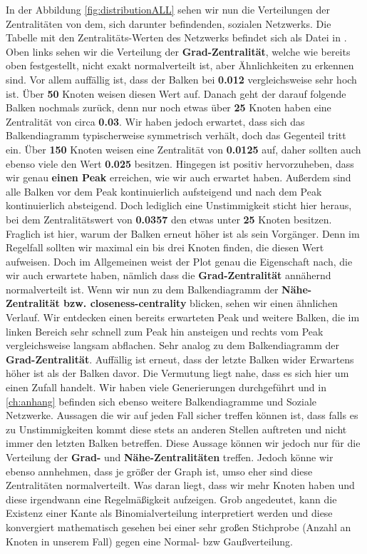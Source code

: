 In der Abbildung \ref{fig:distributionALL} sehen wir nun die Verteilungen der Zentralitäten von dem, sich darunter befindenden, sozialen Netzwerks. Die Tabelle mit den Zentralitäts-Werten des Netzwerks befindet sich als Datei in \cite{TZ}. Oben links sehen wir die Verteilung der \textbf{Grad-Zentralität}, welche wie bereits oben festgestellt, nicht exakt normalverteilt ist, aber Ähnlichkeiten zu erkennen sind. Vor allem auffällig ist, dass der Balken bei \textbf{0.012} vergleichsweise sehr hoch ist. Über \textbf{50} Knoten weisen diesen Wert auf. Danach geht der darauf folgende Balken nochmals zurück, denn nur noch etwas über \textbf{25} Knoten haben eine Zentralität von circa \textbf{0.03}. Wir haben jedoch erwartet, dass sich das Balkendiagramm typischerweise symmetrisch verhält, doch das Gegenteil tritt ein. Über \textbf{150} Knoten weisen eine Zentralität von \textbf{0.0125} auf, daher sollten auch ebenso viele den Wert \textbf{0.025} besitzen. Hingegen ist positiv hervorzuheben, dass wir genau \textbf{einen Peak} erreichen, wie wir auch erwartet haben. Außerdem sind alle Balken vor dem Peak kontinuierlich aufsteigend und nach dem Peak kontinuierlich absteigend. Doch lediglich eine Unstimmigkeit sticht hier heraus, bei dem Zentralitätswert von \textbf{0.0357} den etwas unter \textbf{25} Knoten besitzen. Fraglich ist hier, warum der Balken erneut höher ist als sein Vorgänger. Denn im Regelfall sollten wir maximal ein bis drei Knoten finden, die diesen Wert aufweisen. Doch im Allgemeinen weist der Plot genau die Eigenschaft nach, die wir auch erwartete haben, nämlich dass die \textbf{Grad-Zentralität} annähernd normalverteilt ist. Wenn wir nun zu dem Balkendiagramm der \textbf{Nähe-Zentralität bzw. closeness-centrality} blicken, sehen wir einen ähnlichen Verlauf. Wir entdecken einen bereits erwarteten Peak und weitere Balken, die im linken Bereich sehr schnell zum Peak hin ansteigen und rechts vom Peak vergleichsweise langsam abflachen. Sehr analog zu dem Balkendiagramm der \textbf{Grad-Zentralität}. Auffällig ist erneut, dass der letzte Balken wider Erwartens höher ist als der Balken davor. Die Vermutung liegt nahe, dass es sich hier um einen Zufall handelt. Wir haben viele Generierungen durchgeführt und in \ref{ch:anhang} befinden sich ebenso weitere Balkendiagramme und Soziale Netzwerke. Aussagen die wir auf jeden Fall sicher treffen können ist, dass falls es zu Unstimmigkeiten kommt diese stets an anderen Stellen auftreten und nicht immer den letzten Balken betreffen. Diese Aussage können wir jedoch nur für die Verteilung der \textbf{Grad-} und \textbf{Nähe-Zentralitäten} treffen. Jedoch könne wir ebenso annhehmen, dass je größer der Graph ist, umso eher sind diese Zentralitäten normalverteilt. Was daran liegt, dass wir mehr Knoten haben und diese irgendwann eine Regelmäßigkeit aufzeigen. Grob angedeutet, kann die Existenz einer Kante als Binomialverteilung interpretiert werden und diese konvergiert mathematisch gesehen bei einer sehr großen Stichprobe (Anzahl an Knoten in unserem Fall) gegen eine Normal- bzw Gaußverteilung.
